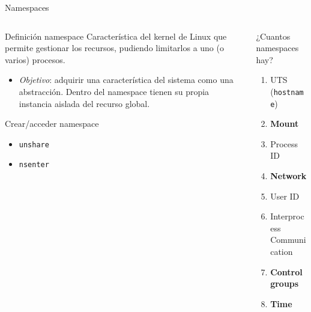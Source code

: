 \documentclass[aspectratio=169,xcolor=dvipsnames]{beamer}
\begin{document}
	\begin{frame}{Namespaces}
	
	    \begin{columns}
	    \begin{column}{0.6\textwidth}
	        \begin{block}{Definición namespace}
	           Característica del kernel de Linux que permite gestionar los recursos, pudiendo limitarlos a uno (o varios) procesos.
	           
	           \begin{itemize}
	               \item \textit{Objetivo}: adquirir una característica del sistema como una abstracción. Dentro del namespace tienen su propia instancia aislada del recurso global.
	           \end{itemize}
	        \end{block}
	        
	        \begin{alertblock}{Crear/acceder namespace}
	            \begin{itemize}
	                \item \texttt{unshare}
	                \item \texttt{nsenter}
	            \end{itemize}
	        \end{alertblock}
	    \end{column}
	    
	    \begin{column}{0.4\textwidth}
	        \begin{exampleblock}{¿Cuantos namespaces hay?}
		    \begin{enumerate}
		        \item UTS (\texttt{hostname})
		        \item \textbf{Mount}
		        \item Process ID
		        \item \textbf{Network}
		        \item User ID
		        \item Interprocess Communication
		        \item \textbf{Control groups}
		        \item \textbf{Time}
		    \end{enumerate}
		\end{exampleblock}
	    \end{column}
	    \end{columns}
	\end{frame}
\end{document}
